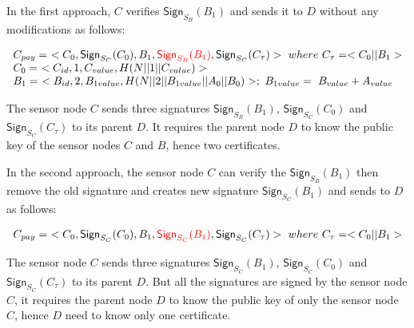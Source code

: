 	In the first approach, $C$ verifies $\textsf{Sign}_{S_{B}}(B_{1})$ and sends it to $D$ without any modifications as follows:
	
	\begin{footnotesize}
		\begin{equation}	
			\begin{array}{l}
				C_{pay} =\ <C_{0},\textsf{Sign}_{S_{C}}(C_{0}),B_{1},\textcolor{red}{\textsf{Sign}_{S_{B}}(B_{1})}, \textsf{Sign}_{S_{C}}(C_{\tau})>\ where\ C_{\tau} = <C_{0} || B_{1}>\\
				C_{0} =\ <C_{id}, 1, C_{value}, H(N||1||C_{value})>\\
				B_{1} =\ <B_{id}, 2, B_{1value}, H(N||2||B_{1value}||A_{0}||B_{0})>;\ B_{1value} =\ B_{value} + A_{value}
			\end{array}
			\label{eq:forwarding-payload-without-resigning}
		\end{equation}
	\end{footnotesize}

	The sensor node $C$ sends three signatures $\textsf{Sign}_{S_{B}}(B_{1})$, $\textsf{Sign}_{S_{C}}(C_{0}) $ and $\textsf{Sign}_{S_{C}}(C_{\tau})$ to its parent $D$.
	It requires the parent node $D$ to know the public key of the sensor nodes $C$ and $B$, hence two certificates.

	In the second approach, the sensor node $C$ can verify the $\textsf{Sign}_{S_{B}}(B_{1})$ then remove the old signature and creates new signature $\textsf{Sign}_{S_{C}}(B_{1})$ and sends to $D$ as follows:

	\begin{footnotesize}
		\begin{equation}	
			\begin{array}{l}
				C_{pay} =\ <C_{0},\textsf{Sign}_{S_{C}}(C_{0}),B_{1},\textcolor{red}{\textsf{Sign}_{S_{C}}(B_{1})}, \textsf{Sign}_{S_{C}}(C_{\tau})>\ where\ C_{\tau} = <C_{0} || B_{1}>\\
			\end{array}
			\label{eq:forwarding-payload-with-resigning}
		\end{equation}
	\end{footnotesize}
	
	The sensor node $C$ sends three signatures $\textsf{Sign}_{S_{C}}(B_{1})$, $\textsf{Sign}_{S_{C}}(C_{0}) $ and $\textsf{Sign}_{S_{C}}(C_{\tau})$ to its parent $D$.
	But all the signatures are signed by the sensor node $C$, it requires the parent node $D$ to know the public key of only the sensor node $C$, hence $D$ need to know only one certificate.


